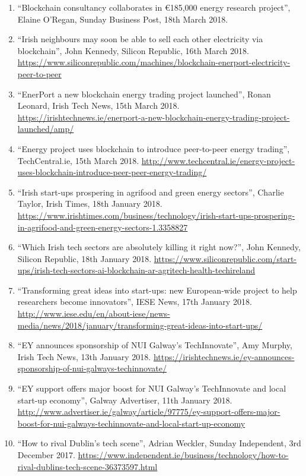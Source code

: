 \documentclass[10pt,a4paper]{res} %
\begin{document}
\begin{resume}
{\begin{enumerate}
\item ``Blockchain consultancy collaborates in \euro{}185,000 energy research project'', Elaine O'Regan, Sunday Business Post, 18th March 2018.
\item ``Irish neighbours may soon be able to sell each other electricity via blockchain'', John Kennedy, Silicon Republic, 16th March 2018. \url{https://www.siliconrepublic.com/machines/blockchain-enerport-electricity-peer-to-peer}
\item ``EnerPort a new blockchain energy trading project launched'', Ronan Leonard, Irish Tech News, 15th March 2018. \url{https://irishtechnews.ie/enerport-a-new-blockchain-energy-trading-project-launched/amp/}
\item ``Energy project uses blockchain to introduce peer-to-peer energy trading'', TechCentral.ie, 15th March 2018. \url{http://www.techcentral.ie/energy-project-uses-blockchain-introduce-peer-peer-energy-trading/}
\item ``Irish start-ups prospering in agrifood and green energy sectors'', Charlie Taylor, Irish Times, 18th January 2018. \url{https://www.irishtimes.com/business/technology/irish-start-ups-prospering-in-agrifood-and-green-energy-sectors-1.3358827}
\item ``Which Irish tech sectors are absolutely killing it right now?'', John Kennedy, Silicon Republic, 18th January 2018. \url{https://www.siliconrepublic.com/start-ups/irish-tech-sectors-ai-blockchain-ar-agritech-health-techireland}
\item ``Transforming great ideas into start-ups: new European-wide project to help researchers become innovators'', IESE News, 17th January 2018. \url{http://www.iese.edu/en/about-iese/news-media/news/2018/january/transforming-great-ideas-into-start-ups/}
\item ``EY announces sponsorship of NUI Galway's TechInnovate'', Amy Murphy, Irish Tech News, 13th January 2018. \url{https://irishtechnews.ie/ey-announces-sponsorship-of-nui-galways-techinnovate/}
\item ``EY support offers major boost for NUI Galway's TechInnovate and local start-up economy'', Galway Advertiser, 11th January 2018. \url{http://www.advertiser.ie/galway/article/97775/ey-support-offers-major-boost-for-nui-galways-techinnovate-and-local-start-up-economy}
\item ``How to rival Dublin's tech scene'', Adrian Weckler, Sunday Independent, 3rd December 2017. \url{https://www.independent.ie/business/technology/how-to-rival-dublins-tech-scene-36373597.html}

\end{enumerate}}
\end{resume}
\end{document}
